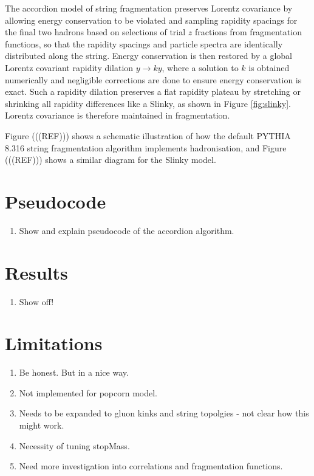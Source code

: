 \documentclass[12pt,a4paper]{report}
\begin{document}
The accordion model of string fragmentation preserves Lorentz covariance by allowing energy conservation to be violated and sampling rapidity spacings for the final two hadrons based on selections of trial $z$ fractions from fragmentation functions, so that the rapidity spacings and particle spectra are identically distributed along the string. Energy conservation is then restored by a global Lorentz covariant rapidity dilation $y \rightarrow ky$, where a solution to $k$ is obtained numerically and negligible corrections are done to ensure energy conservation is exact. Such a rapidity dilation preserves a flat rapidity plateau by stretching or shrinking all rapidity differences like a Slinky, as shown in Figure \ref{fig:slinky}. Lorentz covariance is therefore maintained in fragmentation.

Figure (((REF))) shows a schematic illustration of how the default PYTHIA 8.316 string fragmentation algorithm implements hadronisation, and Figure (((REF))) shows a similar diagram for the Slinky model. 

\section{Pseudocode}
\begin{enumerate}
\item Show and explain pseudocode of the accordion algorithm.
\end{enumerate}

\section{Results}
\begin{enumerate}
\item Show off!
\end{enumerate}

\section{Limitations}
\begin{enumerate}
\item Be honest. But in a nice way.
\item Not implemented for popcorn model.
\item Needs to be expanded to gluon kinks and string topolgies - not clear how this might work.
\item Necessity of tuning stopMass.
\item Need more investigation into correlations and fragmentation functions.
\end{enumerate}
\end{document}
